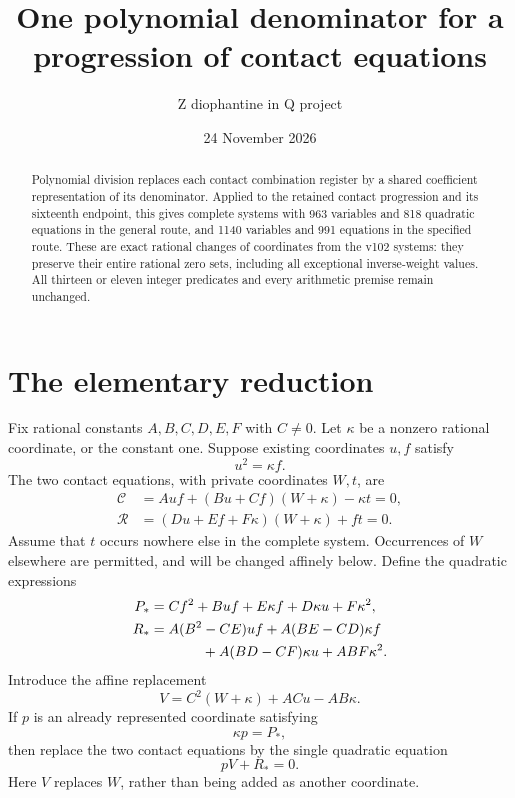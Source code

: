 \documentclass[11pt]{article}
\title{One polynomial denominator for a progression of contact equations}
\author{Z diophantine in Q project}
\date{24 November 2026}
\begin{document}
\maketitle
\begin{abstract}
Polynomial division replaces each contact combination register by a
shared coefficient representation of its denominator. Applied to the
retained contact progression and its sixteenth endpoint, this gives
complete systems with 963 variables and 818 quadratic equations in the
general route, and 1140 variables and 991 equations in the specified
route. These are exact rational changes of coordinates from the v102
systems: they preserve their entire rational zero sets, including all
exceptional inverse-weight values. All thirteen or eleven integer
predicates and every arithmetic premise remain unchanged.
\end{abstract}

\section{The elementary reduction}

Fix rational constants $A,B,C,D,E,F$ with $C\ne0$. Let $\kappa$
be a nonzero rational coordinate, or the constant one. Suppose existing
coordinates $u,f$ satisfy
\begin{equation}\label{square}
                            u^2=\kappa f.
\end{equation}
The two contact equations, with private coordinates $W,t$, are
\begin{align}
 \mathcal C&=Auf+(Bu+Cf)(W+\kappa)-\kappa t=0,\label{comb}\\
 \mathcal R&=(Du+Ef+F\kappa)(W+\kappa)+ft=0.\label{rel}
\end{align}
Assume that $t$ occurs nowhere else in the complete system. Occurrences
of $W$ elsewhere are permitted, and will be changed affinely below.
Define the quadratic expressions
\begin{align}
 P_*&=Cf^2+Buf+E\kappa f+D\kappa u+F\kappa^2,\label{P}\\
 R_*&=A(B^2-CE)uf+A(BE-CD)\kappa f\nonumber\\
    &\hspace{13mm}+A(BD-CF)\kappa u+ABF\kappa^2.\label{R}
\end{align}
Introduce the affine replacement
\begin{equation}\label{V}
                  V=C^2(W+\kappa)+ACu-AB\kappa.
\end{equation}
If $p$ is an already represented coordinate satisfying
\begin{equation}\label{p}
                             \kappa p=P_*,
\end{equation}
then replace the two contact equations by the single quadratic equation
\begin{equation}\label{new}
                                  pV+R_*=0.
\end{equation}
Here $V$ replaces $W$, rather than being added as another coordinate.
\end{document}
